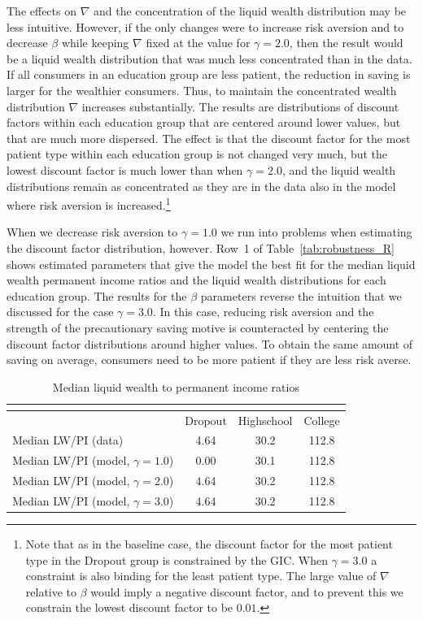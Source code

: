 \documentclass[../HAFiscal]{subfiles}
\begin{document}
The effects on $\nabla$ and the concentration of the liquid wealth distribution may be less intuitive. However, if the only changes were to increase risk aversion and to decrease $\beta$ while keeping $\nabla$ fixed at the value for $\gamma=2.0$, then the result would be a liquid wealth distribution that was much less concentrated than in the data. If all consumers in an education group are less patient, the reduction in saving is larger for the wealthier consumers. Thus, to maintain the concentrated wealth distribution $\nabla$ increases substantially. The results are distributions of discount factors within each education group that are centered around lower values, but that are much more dispersed. The effect is that the discount factor for the most patient type within each education group is not changed very much, but the lowest discount factor is much lower than when $\gamma=2.0$, and the liquid wealth distributions remain as concentrated as they are in the data also in the model where risk aversion is increased.\footnote{Note that as in the baseline case, the discount factor for the most patient type in the Dropout group is constrained by the GIC. When $\gamma=3.0$ a constraint is also binding for the least patient type. The large value of $\nabla$ relative to $\beta$ would imply a negative discount factor, and to prevent this we constrain the lowest discount factor to be $0.01$.}

When we decrease risk aversion to $\gamma=1.0$ we run into problems when estimating the discount factor distribution, however. Row~1 of Table~\ref{tab:robustness_R} shows estimated parameters that give the model the best fit for the median liquid wealth permanent income ratios and the liquid wealth distributions for each education group. The results for the $\beta$ parameters reverse the intuition that we discussed for the case $\gamma=3.0$. In this case, reducing risk aversion and the strength of the precautionary saving motive is counteracted by centering the discount factor distributions around higher values. To obtain the same amount of saving on average, consumers need to be more patient if they are less risk averse.  

\begin{table}[th]
\begin{center}
\begin{tabular}{lccc}
	\multicolumn{4}{l}{} \\ \midrule
	& Dropout & Highschool & College \\ \midrule
	Median LW/PI (data) & 4.64 & 30.2 & 112.8 \\ 
	Median LW/PI (model, $\gamma = 1.0$) & 0.00 & 30.1 & 112.8 \\	
	Median LW/PI (model, $\gamma = 2.0$) & 4.64 & 30.2 & 112.8 \\
	Median LW/PI (model, $\gamma = 3.0$) & 4.64 & 30.2 & 112.8 \\ \bottomrule
\end{tabular}
\end{center}
\label{tab:robustness_gamma_liquid}	
\caption{Median liquid wealth to permanent income ratios}
\end{table}
\end{document}
